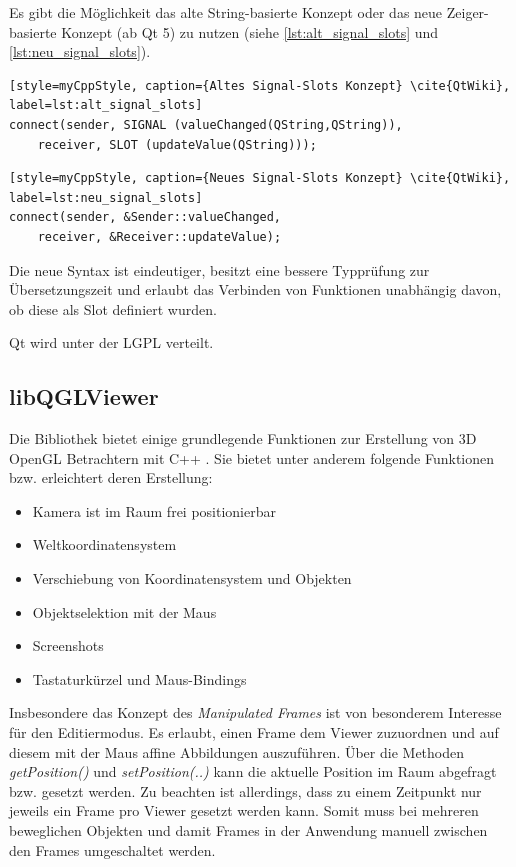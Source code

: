 Es gibt die Möglichkeit das alte String-basierte Konzept oder das neue Zeiger-basierte Konzept (ab Qt 5) zu nutzen (siehe \autoref{lst:alt_signal_slots} und \autoref{lst:neu_signal_slots}).

\begin{lstlisting}[style=myCppStyle, caption={Altes Signal-Slots Konzept} \cite{QtWiki}, label=lst:alt_signal_slots]
connect(sender, SIGNAL (valueChanged(QString,QString)), 
	receiver, SLOT (updateValue(QString)));
\end{lstlisting}

\begin{lstlisting}[style=myCppStyle, caption={Neues Signal-Slots Konzept} \cite{QtWiki}, label=lst:neu_signal_slots]
connect(sender, &Sender::valueChanged, 
	receiver, &Receiver::updateValue);
\end{lstlisting}

Die neue Syntax ist eindeutiger, besitzt eine bessere Typprüfung zur Übersetzungszeit und erlaubt das Verbinden von Funktionen unabhängig davon, ob diese als Slot definiert wurden.

Qt wird unter der LGPL verteilt.

\subsection{libQGLViewer} 

Die Bibliothek bietet einige grundlegende Funktionen zur Erstellung von 3D OpenGL Betrachtern mit C++ \cite{libQGLViewer}.
Sie bietet unter anderem folgende Funktionen bzw. erleichtert deren Erstellung:

\begin{itemize}
\item Kamera ist im Raum frei positionierbar 
\item Weltkoordinatensystem
\item Verschiebung von Koordinatensystem und Objekten
\item Objektselektion mit der Maus
\item Screenshots
\item Tastaturkürzel und Maus-Bindings
\end{itemize}

Insbesondere das Konzept des \emph{Manipulated Frames} ist von besonderem Interesse für den Editiermodus. 
Es erlaubt, einen Frame dem Viewer zuzuordnen und auf diesem mit der Maus affine Abbildungen auszuführen.
Über die Methoden \emph{getPosition()} und \emph{setPosition(..)} kann die aktuelle Position im Raum abgefragt bzw. gesetzt werden.
Zu beachten ist allerdings, dass zu einem Zeitpunkt nur jeweils ein Frame pro Viewer gesetzt werden kann.
Somit muss bei mehreren beweglichen Objekten und damit Frames in der Anwendung manuell zwischen den Frames umgeschaltet werden.

